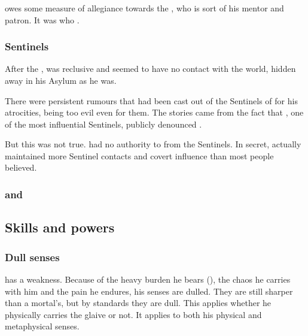 \subsubsection{\NerrhanKoss}
\Ishnaruchaefir{} owes some measure of allegiance towards the \xs{} , who is sort of his mentor and patron. 
It was \NerrhanKoss{} who . 





\subsubsection{Sentinels}
After the \SecondShrouding, \Ishnaruchaefir{} was reclusive and seemed to have no contact with the world, hidden away in his Asylum as he was. 

There were persistent rumours that \Ishnaruchaefir{} had been cast out of the Sentinels of \Miith{} for his atrocities, being too evil even for them. 
The stories came from the fact that \Secherdamon, one of the most influential Sentinels, publicly denounced \Ishnaruchaefir. 

But this was not true. 
\Secherdamon{} had no authority to  \Ishnaruchaefir{} from the Sentinels. 
In secret, \Ishnaruchaefir{} actually maintained more Sentinel contacts and covert influence than most people believed. 





\subsubsection{\Zaz and \Urzaz}










\subsection{Skills and powers}





\subsubsection{Dull senses}
\Ishnaruchaefir{} has a weakness. 
Because of the heavy burden he bears (\Rystessakhin), the chaos he carries with him and the pain he endures, his senses are dulled. 
They are still sharper than a mortal's, but by \draconic{} standards they are dull. 
This applies whether he physically carries the glaive or not. 
It applies to both his physical and metaphysical senses. 

